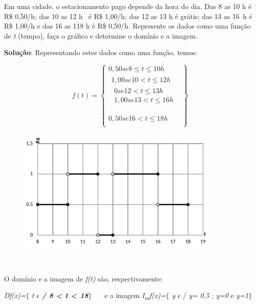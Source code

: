 \begin{texemplo}
Em uma cidade, o estacionamento pago depende da hora do dia. Das 8 as 10 h é R$\$$  0,50/h; das 10 as 12 h~ é R$\$$  1,00/h; das 12 as 13 h é grátis; das 13 as 16~h  é R$\$$  1,00/h e das 16 as 118 h é R$\$$  0,50/h. Represente os dados como uma função de \textit{t} (tempo), faça o gráfico e determine o domínio e a imagem.

\textbf{Solução}: Representando estes dados como uma função, temos:

 \[ f \left( t \right) = \left\{ \begin{matrix}
0,50 se 8 \leq t \leq 10h\\
\begin{matrix}
1,00 se 10<t \leq 12h\\
\begin{matrix}
0 se 12<t \leq 13h\\
1,00 se 13<t \leq 16h\\
\end{matrix}
\\
\end{matrix}
\\
0,50 se 16<t \leq 18h\\
\end{matrix}\right\}
\]

\begin{figure}[H]
	\begin{Center}
		\includegraphics[width=3.91in,height=2.36in]{capitulos/outras_funcoes/media/image23.pdf}
	\end{Center}
\end{figure}

~~

O domínio e a imagem de \textit{f(t)} são, respectivamente: 

\textit{Df(x)=$ \{ $ t $ \epsilon $  \textbf{ / 8 < t < 18}$ \} $ }~~~e a imagem  \textit{I\textsubscript{m}f(x)=$ \{ $ y $ \epsilon $  }/ \textit{y= 0,5} ; \textit{y=0} e \textit{y=1$ \} $ }~ \qedsymbol{}
\end{texemplo}

